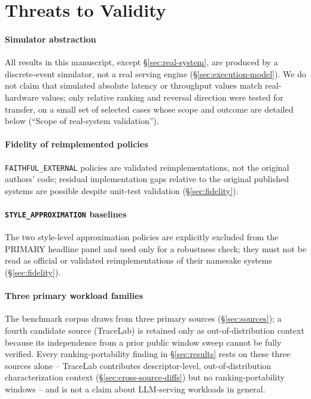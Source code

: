 \section{Threats to Validity}
\label{sec:threats}

\paragraph{Simulator abstraction} All results in this manuscript, except
\S\ref{sec:real-system}, are produced by a discrete-event simulator, not a
real serving engine (\S\ref{sec:execution-model}). We do not claim that
simulated absolute latency or throughput values match real-hardware
values; only relative ranking and reversal direction were tested for
transfer, on a small set of selected cases whose scope and outcome are
detailed below (``Scope of real-system validation'').

\paragraph{Fidelity of reimplemented policies} \texttt{FAITHFUL\_EXTERNAL}
policies are validated reimplementations, not the original authors' code;
residual implementation gaps relative to the original published systems
are possible despite unit-test validation (\S\ref{sec:fidelity}).

\paragraph{\texttt{STYLE\_APPROXIMATION} baselines} The two style-level
approximation policies are explicitly excluded from the PRIMARY headline
panel and used only for a robustness check; they must not be read as
official or validated reimplementations of their namesake systems
(\S\ref{sec:fidelity}).

\paragraph{Three primary workload families} The benchmark corpus draws from
three primary sources (\S\ref{sec:sources}); a fourth candidate source
(TraceLab) is retained only as out-of-distribution context because its
independence from a prior public window sweep cannot be fully verified.
Every ranking-portability finding in \S\ref{sec:results} rests on these
three sources alone -- TraceLab contributes descriptor-level,
out-of-distribution characterization context (\S\ref{sec:cross-source-diffs})
but no ranking-portability windows -- and is not a claim about LLM-serving
workloads in general.


